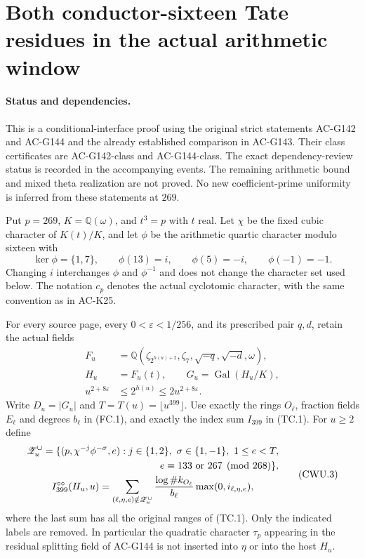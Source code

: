 \section{Both conductor-sixteen Tate residues in the actual arithmetic window}
\label{sec:conductor16-two-residue-window}

\paragraph{Status and dependencies.}
This is a conditional-interface proof using the original strict statements
AC-G142 and AC-G144 and the already established comparison in AC-G143.
Their class certificates are AC-G142-class and AC-G144-class.
The exact dependency-review status is recorded in the accompanying events.
The remaining arithmetic bound and mixed theta realization are not proved.
No new coefficient-prime uniformity is inferred from these statements at $269$.

Put $p=269$, $K=\mathbb Q(\omega)$, and $t^3=p$ with $t$ real.
Let $\chi$ be the fixed cubic character of $K(t)/K$, and let $\phi$
be the arithmetic quartic character modulo sixteen with
\[
 \ker\phi=\{1,7\},\qquad \phi(13)=i,\qquad
 \phi(5)=-i,\qquad \phi(-1)=-1.
 \tag{CWU.1}
\]
Changing $i$ interchanges $\phi$ and $\phi^{-1}$ and does not change
the character set used below.  The notation $c_p$ denotes the actual
cyclotomic character, with the same convention as in AC-K25.

For every source page, every $0<\varepsilon<1/256$, and its prescribed
pair $q,d$, retain the actual fields
\[
 \begin{split}
 F_u&=\mathbb Q(\zeta_{2^{h(u)+2}},\zeta_7,
                    \sqrt{-q},\sqrt{-d},\omega),\\
 H_u&=F_u(t),\qquad G_u=\operatorname{Gal}(H_u/K),\\
 u^{2+8\varepsilon}&\leq2^{h(u)}\leq2u^{2+8\varepsilon}.
 \end{split}
 \tag{CWU.2}
\]
Write $D_u=|G_u|$ and $T=T(u)=\lfloor u^{399}\rfloor$.
Use exactly the rings $O_\ell$, fraction fields $E_\ell$ and degrees
$b_\ell$ in (FC.1), and exactly the index sum $I_{399}$ in (TC.1).
For $u\geq2$ define
\[
 \begin{gathered}
 \mathscr Z_u^{\cup}=
 \{(p,\chi^{-j}\phi^{-\sigma},e):
 j\in\{1,2\},\ \sigma\in\{1,-1\},\ 1\leq e<T,\\
 \hfill e\equiv133\text{ or }267\pmod{268}\},\\
 I_{399}^{\circ\circ}(H_u,u)=
 \sum_{(\ell,\eta,e)\notin\mathscr Z_u^{\cup}}
       \frac{\log\#k_{O_\ell}}{b_\ell}
                              \max(0,i_{\ell,\eta,e}),
 \end{gathered}
 \tag{CWU.3}
\]
where the last sum has all the original ranges of (TC.1).
Only the indicated labels are removed.  In particular the quadratic
character $\tau_p$ appearing in the residual splitting field of
AC-G144 is not inserted into $\eta$ or into the host $H_u$.

